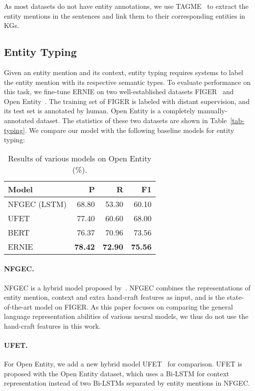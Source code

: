 \documentclass[11pt,a4paper]{article}
\begin{document}
As most datasets do not have entity annotations, we use TAGME~\cite{ferragina2010tagme} to extract the entity mentions in the sentences and link them to their corresponding entities in KGs. 


\subsection{Entity Typing}

Given an entity mention and its context, entity typing requires systems to label the entity mention with its respective semantic types. To evaluate performance on this task, we fine-tune ERNIE on two well-established datasets FIGER~\cite{ling2015design} and Open Entity~\cite{choi2018ultra}. The training set of FIGER is labeled with distant supervision, and its test set is annotated by human. Open Entity is a completely manually-annotated dataset. The statistics of these two datasets are shown in Table~\ref{tab-typing}. We compare our model with the following baseline models for entity typing:


\begin{table}[t]
\centering
\scriptsize
\begin{tabular}{l|rrr}
  \toprule
  Model & P & R & F1\\
  \midrule
  NFGEC (LSTM) & 68.80 & 53.30 & 60.10\\
  UFET & 77.40 & 60.60 & 68.00\\
  BERT & 76.37 & 70.96 & 73.56 \\
  \midrule
  ERNIE & \textbf{78.42} & \textbf{72.90} & \textbf{75.56} \\
  \bottomrule
\end{tabular}
\caption{Results of various models on Open Entity (\%).}
\label{tab-et-open}
\vspace{-3mm}
\end{table}

\paragraph{NFGEC.} NFGEC is a hybrid model proposed by~. NFGEC combines the representations of entity mention, context and extra hand-craft features as input, and is the state-of-the-art model on FIGER. As this paper focuses on comparing the general language representation abilities of various neural models, we thus do not use the hand-craft features in this work. 


\paragraph{UFET.} For Open Entity, we add a new hybrid model UFET~\cite{choi2018ultra} for comparison. UFET is proposed with the Open Entity dataset, which uses a Bi-LSTM for context representation instead of two Bi-LSTMs separated by entity mentions in NFGEC. 
\end{document}
